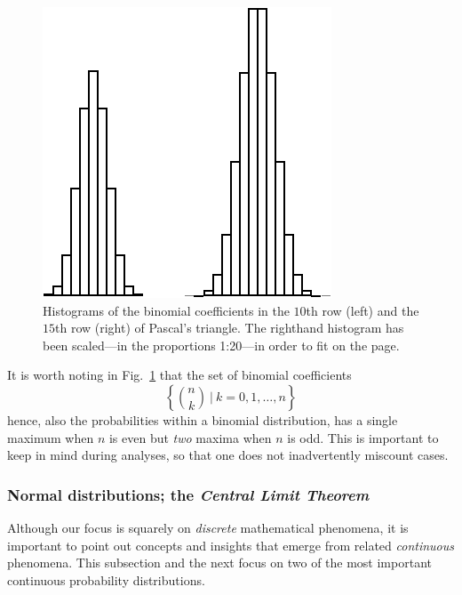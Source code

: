 \begin{figure}[htb]
\begin{center}
        \includegraphics[scale=0.5]{FiguresMaths/ProbaGaussianDistribution}
        \caption{Histograms of the binomial coefficients in the $10$th row (left) and the $15$th row (right) of Pascal's triangle.  The righthand histogram has been scaled---in the proportions 1:20---in order to fit on the page.}
        \label{fig:gaussiandistribution}
\end{center}
\end{figure}

It is worth noting in Fig.~\ref{fig:gaussiandistribution} that the set of binomial coefficients
\[ \left\{ {n \choose k} \ | \ k = 0, 1, \ldots, n \right\} \]
hence, also the probabilities within a binomial distribution, has a single maximum when $n$ is even but {\em two} maxima when $n$ is odd.  This is important to keep in mind during analyses, so that one does not inadvertently miscount cases.


\subsubsection{Normal distributions; the {\em Central Limit Theorem}} 
\label{sec:normal-distr}

  
 

Although our focus is squarely on {\em discrete} mathematical phenomena, it is important to point out concepts and insights that emerge from related {\em continuous} phenomena.  This subsection and the next focus on two of the most important continuous probability distributions.


